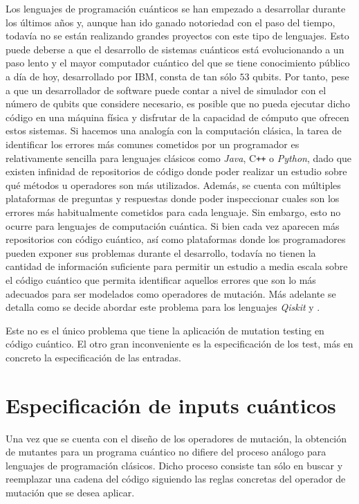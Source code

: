 Los lenguajes de programación cuánticos se han empezado a desarrollar durante los últimos años y, aunque han ido ganado notoriedad con el paso del tiempo, todavía no se están realizando grandes proyectos con este tipo de lenguajes. Esto puede deberse a que el desarrollo de sistemas cuánticos está evolucionando a un paso lento y el mayor computador cuántico del que se tiene conocimiento público a día de hoy, desarrollado por IBM, consta de tan sólo $53$ qubits. Por tanto, pese a que un desarrollador de software puede contar a nivel de simulador con el número de qubits que considere necesario, es posible que no pueda ejecutar dicho código en una máquina física y disfrutar de la capacidad de cómputo que ofrecen estos sistemas.
%
Si hacemos una analogía con la computación clásica,
la tarea de identificar los errores más comunes cometidos por un programador es relativamente sencilla para lenguajes clásicos como \textit{Java}, C\texttt{++} o \textit{Python}, dado que existen infinidad de repositorios de código donde poder realizar un estudio sobre qué métodos u operadores son más utilizados. Además,  se cuenta con múltiples plataformas de preguntas y respuestas donde poder inspeccionar cuales son los errores más habitualmente cometidos para cada lenguaje. Sin embargo, esto no ocurre para lenguajes de computación cuántica. Si bien cada vez aparecen más repositorios con código cuántico, así como  plataformas donde los programadores pueden exponer sus problemas durante el desarrollo, todavía no tienen la cantidad de información suficiente para permitir un estudio a media escala sobre el código cuántico que permita identificar aquellos errores que son lo más adecuados para ser modelados como operadores de mutación. Más adelante se detalla como se decide abordar este problema para los lenguajes \textit{Qiskit} y \qsh.

Este no es el único problema que tiene la aplicación de mutation testing en código cuántico. El otro gran inconveniente es la especificación de los test, más en concreto la especificación de las entradas.

\section{Especificación de inputs cuánticos}

Una vez que se cuenta con el diseño de los operadores de mutación, la obtención de mutantes para un programa cuántico no difiere del proceso análogo para lenguajes de programación clásicos. Dicho proceso consiste tan sólo en buscar y reemplazar una cadena del código siguiendo las reglas concretas del operador de mutación que se desea aplicar.

